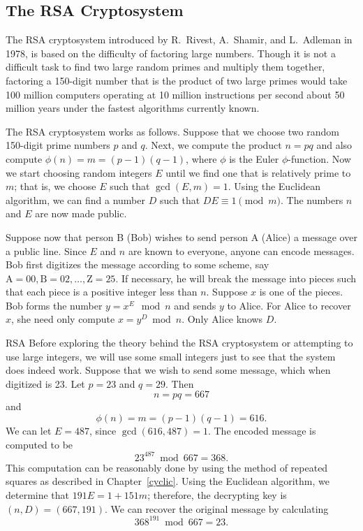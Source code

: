 \subsection*{The RSA Cryptosystem}
 
The RSA cryptosystem introduced by R.~Rivest,
A.~Shamir, and L.~Adleman in
1978, is based on the difficulty of factoring large numbers. Though it
is not a difficult task to find two large random primes and multiply
them together, factoring a 150-digit number that is the product of two
large primes would take 100 million computers operating at 10 million
instructions per second about 50 million years under the fastest
algorithms currently known.
 
 
The RSA cryptosystem
works as follows. Suppose that we choose two random 150-digit prime
numbers $p$ and $q$. Next, we compute the product $n= pq$ and also
compute $\phi(n) = m = (p - 1)(q-1)$, where $\phi$ is the Euler
$\phi$-function.  Now we start choosing random integers $E$ until we
find one that is relatively prime to $m$; that is, we choose $E$ such
that $\gcd(E, m) = 1$. Using the Euclidean algorithm, we can find a
number $D$ such that \mbox{$DE \equiv 1 \pmod{m}$}. The numbers $n$ and $E$
are now made public. 
 
 
Suppose now that person B (Bob) wishes to send person A (Alice) a
message over a public line. Since $E$ and $n$ are known to everyone,
anyone can encode messages. Bob first digitizes the message according
to some scheme, say $\mbox{A}  = 00, \mbox{B}  = 02, \ldots, \mbox{Z}=
25$. If necessary, he will break the message into pieces such that
each piece is a positive integer less than $n$.  Suppose $x$ is one of
the pieces.  Bob forms the number $y = x^E \mod n$ and sends $y$ to
Alice. For Alice to recover $x$, she need only compute $x = y^D \bmod
n$. Only Alice knows $D$.  
 
 
\begin{example}{RSA}
Before exploring the theory behind the RSA cryptosystem or attempting
to use large integers, we will use some small integers just to see
that the system does indeed work. Suppose that we wish to send some
message, which when digitized is 23. Let $p = 23$ and $q = 29$. Then 
\[
n = pq = 667
\]
and
\[
\phi(n) = m = (p - 1)(q - 1) = 616.
\]
We can let $E = 487$, since $\gcd(616, 487) = 1$. The encoded message
is computed to be  
\[
23^{487} \bmod 667 = 368.
\]
This computation can be reasonably done by using the method of
repeated squares as described in Chapter~\ref{cyclic}. Using the Euclidean
algorithm, we determine that $191 E = 1 + 151 m$; therefore, the
decrypting key is $(n, D) = ( 667, 191)$. We can recover the original 
message by calculating  
\[
368^{191} \bmod 667 = 23.
\]
\end{example}
 
